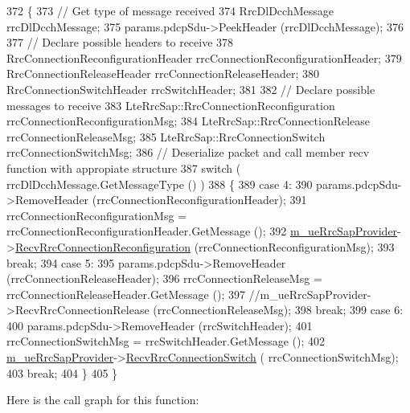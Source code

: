 \begin{DoxyCode}
372 \{
373   \textcolor{comment}{// Get type of message received}
374   RrcDlDcchMessage rrcDlDcchMessage;
375   params.pdcpSdu->PeekHeader (rrcDlDcchMessage);
376 
377   \textcolor{comment}{// Declare possible headers to receive}
378   RrcConnectionReconfigurationHeader rrcConnectionReconfigurationHeader;
379   RrcConnectionReleaseHeader rrcConnectionReleaseHeader;
380   RrcConnectionSwitchHeader rrcSwitchHeader;
381 
382   \textcolor{comment}{// Declare possible messages to receive}
383   LteRrcSap::RrcConnectionReconfiguration rrcConnectionReconfigurationMsg;
384   LteRrcSap::RrcConnectionRelease rrcConnectionReleaseMsg;
385   LteRrcSap::RrcConnectionSwitch rrcConnectionSwitchMsg;
386   \textcolor{comment}{// Deserialize packet and call member recv function with appropiate structure}
387   \textcolor{keywordflow}{switch} ( rrcDlDcchMessage.GetMessageType () )
388     \{
389     \textcolor{keywordflow}{case} 4:
390       params.pdcpSdu->RemoveHeader (rrcConnectionReconfigurationHeader);
391       rrcConnectionReconfigurationMsg = rrcConnectionReconfigurationHeader.GetMessage ();
392       \hyperlink{classns3_1_1LteUeRrcProtocolReal_a1d594fbb2755388a84d4d1d53298b0f8}{m\_ueRrcSapProvider}->\hyperlink{classns3_1_1LteUeRrcSapProvider_a16f321a91134b1597bcf3a9e85eba39d}{RecvRrcConnectionReconfiguration}
       (rrcConnectionReconfigurationMsg);
393       \textcolor{keywordflow}{break};
394     \textcolor{keywordflow}{case} 5:
395       params.pdcpSdu->RemoveHeader (rrcConnectionReleaseHeader);
396       rrcConnectionReleaseMsg = rrcConnectionReleaseHeader.GetMessage ();
397       \textcolor{comment}{//m\_ueRrcSapProvider->RecvRrcConnectionRelease (rrcConnectionReleaseMsg);}
398       \textcolor{keywordflow}{break};
399     \textcolor{keywordflow}{case} 6:
400       params.pdcpSdu->RemoveHeader (rrcSwitchHeader);
401       rrcConnectionSwitchMsg = rrcSwitchHeader.GetMessage ();
402       \hyperlink{classns3_1_1LteUeRrcProtocolReal_a1d594fbb2755388a84d4d1d53298b0f8}{m\_ueRrcSapProvider}->\hyperlink{classns3_1_1LteUeRrcSapProvider_ade488446e890f38224f21e37ea3db2a2}{RecvRrcConnectionSwitch} (
      rrcConnectionSwitchMsg);
403       \textcolor{keywordflow}{break};
404     \}
405 \}
\end{DoxyCode}


Here is the call graph for this function\+:


